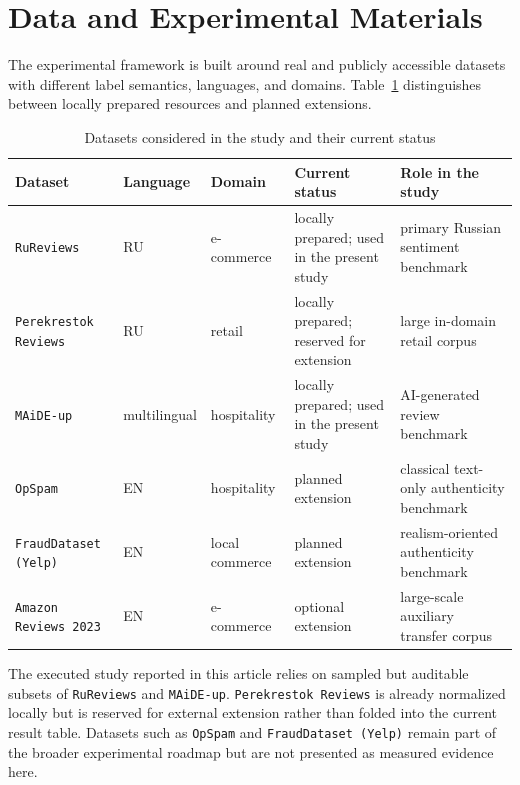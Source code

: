 \documentclass[12pt,a4paper]{article}
\begin{document}
\section{Data and Experimental Materials}

The experimental framework is built around real and publicly accessible datasets with different label semantics, languages, and domains. Table~\ref{tab:datasets} distinguishes between locally prepared resources and planned extensions.

\begin{table}[h]
\centering
\caption{Datasets considered in the study and their current status}
\label{tab:datasets}
\begin{tabular}{>{\raggedright\arraybackslash}p{3.3cm} >{\raggedright\arraybackslash}p{1.4cm} >{\raggedright\arraybackslash}p{2.2cm} >{\raggedright\arraybackslash}p{2.4cm} >{\raggedright\arraybackslash}p{4.8cm}}
\toprule
Dataset & Language & Domain & Current status & Role in the study \\
\midrule
\texttt{RuReviews} & RU & e-commerce & locally prepared; used in the present study & primary Russian sentiment benchmark \\
\texttt{Perekrestok Reviews} & RU & retail & locally prepared; reserved for extension & large in-domain retail corpus \\
\texttt{MAiDE-up} & multilingual & hospitality & locally prepared; used in the present study & AI-generated review benchmark \\
\texttt{OpSpam} & EN & hospitality & planned extension & classical text-only authenticity benchmark \\
\texttt{FraudDataset (Yelp)} & EN & local commerce & planned extension & realism-oriented authenticity benchmark \\
\texttt{Amazon Reviews 2023} & EN & e-commerce & optional extension & large-scale auxiliary transfer corpus \\
\bottomrule
\end{tabular}
\end{table}

The executed study reported in this article relies on sampled but auditable subsets of \texttt{RuReviews} and \texttt{MAiDE-up}. \texttt{Perekrestok Reviews} is already normalized locally but is reserved for external extension rather than folded into the current result table. Datasets such as \texttt{OpSpam} and \texttt{FraudDataset (Yelp)} remain part of the broader experimental roadmap but are not presented as measured evidence here.
\end{document}
